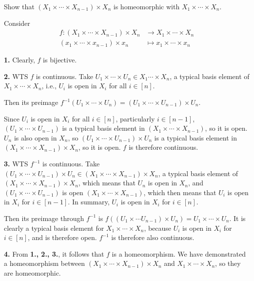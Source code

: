 \documentclass[a4paper, 12pt]{article}
\begin{document}
\begin{problem} 
Show that $(X_1 \times \cdots \times X_{n-1}) \times X_n$ is homeomorphic with $X_1 \times \cdots \times X_n$.
\end{problem}
\begin{solution}
    Consider \begin{align*}
        f: (X_1 \times \cdots \times X_{n-1}) \times X_n &\to X_1 \times \cdots \times X_n \\
        (x_1 \times \cdots \times x_{n-1}) \times x_n & \mapsto x_1 \times \cdots \times x_n
    \end{align*}

    \textbf{1.} Clearly, $f$ is bijective.

    \textbf{2.} WTS $f$ is continuous. Take $U_1 \times \cdots \times U_n \in X_1 \cdots \times X_n$, a typical basis element of $X_1 \times \cdots \times X_n$, i.e., $U_i$ is open in $X_i$ for all $i \in [n]$.

    Then its preimage $f^{-1}(U_1 \times \cdots \times U_n) = (U_1 \times \cdots \times U_{n-1}) \times U_n$.

    Since $U_i$ is open in $X_i$ for all $i \in [n]$, particularly $i \in [n-1]$, $(U_1 \times \cdots \times U_{n-1})$ is a typical basis element in $(X_1 \times \cdots \times X_{n-1})$, so it is open. $U_n$ is also open in $X_n$, so $(U_1 \times \cdots \times U_{n-1}) \times U_n$ is a typical basis element in $(X_1 \times \cdots \times X_{n-1}) \times X_n$, so it is open. $f$ is therefore continuous.

    \textbf{3.} WTS $f^{-1}$ is continuous. Take $(U_1 \times \cdots \times U_{n-1}) \times U_n \in (X_1 \times \cdots \times X_{n-1}) \times X_n$, a typical basis element of $(X_1 \times \cdots \times X_{n-1}) \times X_n$, which means that $U_n$ is open in $X_n$, and $(U_1 \times \cdots \times U_{n-1})$ is open $(X_1 \times \cdots \times X_{n-1})$, which then means that $U_i$ is open in $X_i$ for $i \in [n-1]$. In summary, $U_i$ is open in $X_i$ for $i \in [n]$.

    Then its preimage through $f^{-1}$ is $f((U_1 \times \cdots U_{n-1}) \times U_n) = U_1 \times \cdots \times U_n$. It is clearly a typical basis element for $X_1 \times \cdots \times X_n$, because $U_i$ is open in $X_i$ for $i \in [n]$, and is therefore open. $f^{-1}$ is therefore also continuous.

    \textbf{4.} From \textbf{1., 2., 3.}, it follows that $f$ is a homeomorphism. We have demonstrated a homeomorphism between $(X_1 \times \cdots \times X_{n-1}) \times X_n$ and $X_1 \times \cdots \times X_n$, so they are homeomorphic.
\end{solution}
\end{document}

